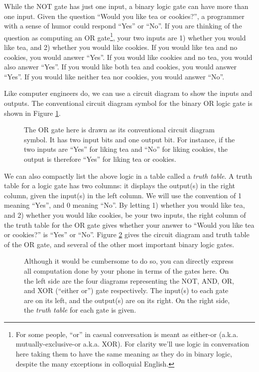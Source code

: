\documentclass{article}
\begin{document}
While the NOT gate has just one input, a binary logic gate can have more than one input.  Given the question ``Would you like tea or cookies?'', a programmer with a sense of humor could respond ``Yes'' or ``No''.  If you are thinking of the question as computing an OR gate\footnote{For some people, ``or'' in casual conversation is meant as either-or (a.k.a. mutually-exclusive-or a.k.a. XOR).  For clarity we'll use logic in conversation here taking them to have the same meaning as they do in binary logic, despite the many exceptions in colloquial English.}, your two inputs are 1) whether you would like tea, and 2) whether you would like cookies.  If you would like tea and no cookies, you would answer ``Yes''.  If you would like cookies and no tea, you would also answer ``Yes''.  If you would like both tea and cookies, you would answer ``Yes''.  If you would like neither tea nor cookies, you would answer ``No''.

Like computer engineers do, we can use a circuit diagram to show the inputs and outputs.  The conventional circuit diagram symbol for the binary OR logic gate is shown in Figure \ref{ref:teaorcookies}.

\begin{figure}[h!]
	\label{ref:teaorcookies}
	\caption{The OR gate here is drawn as its conventional circuit diagram symbol.  It has two input bits and one output bit.  For instance, if the two inputs are ``Yes'' for liking tea and ``No'' for liking cookies, the output is therefore ``Yes'' for liking tea or cookies.}
\end{figure}

We can also compactly list the above logic in a table called a \textit{truth table}.  A truth table for a logic gate has two columns: it displays the output(s) in the right column, given the input(s) in the left column.  We will use the convention of 1 meaning ``Yes'', and 0 meaning ``No''.  By letting 1) whether you would like tea, and 2) whether you would like cookies, be your two inputs, the right column of the truth table for the OR gate gives whether your answer to ``Would you like tea or cookies?'' is ``Yes'' or ``No''.  Figure \ref{fig:classical_logic_gates} gives the circuit diagram and truth table of the OR gate, and several of the other most important binary logic gates.
\begin{figure}[h!]
	\label{fig:classical_logic_gates}
	\caption{Although it would be cumbersome to do so, you can directly express all computation done by your phone in terms of the gates here.  On the left side are the four diagrams representing the NOT, AND, OR, and XOR (``either or'') gate respectively.  The input(s) to each gate are on its left, and the output(s) are on its right.  On the right side, the \textit{truth table} for each gate is given.}
\end{figure}
\end{document}
